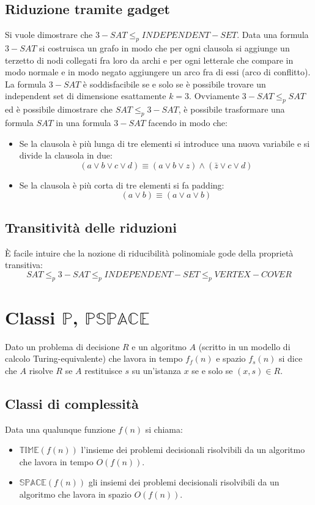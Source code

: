 \subsection{Riduzione tramite gadget}
Si vuole dimostrare che $3-SAT\le_p INDEPENDENT-SET$. Data una formula $3-SAT$ si costruisca un grafo in modo che per ogni clausola si aggiunge un terzetto di nodi collegati fra loro
da archi e per ogni letterale che compare in modo normale e in modo negato aggiungere un arco fra di essi (arco di conflitto). La formula $3-SAT$ \`e soddisfacibile se e solo se \`e
possibile trovare un independent set di dimensione esattamente $k=3$.
Ovviamente $3-SAT\le_p SAT$ ed \`e possibile dimostrare che $SAT\le_p 3-SAT$, \`e possibile trasformare una formula $SAT$ in una formula $3-SAT$ facendo in modo che:
\begin{itemize}
	\item Se la clausola \`e pi\`u lunga di tre elementi si introduce una nuova variabile e si divide la clausola in due:
		$$(a\lor b\lor c\lor d)\equiv (a\lor b\lor z)\land(\bar{z}\lor c\lor d)$$
	\item Se la clausola \`e pi\`u corta di tre elementi si fa padding:
		$$(a\lor b)\equiv (a\lor a\lor b)$$
\end{itemize}
\subsection{Transitivit\`a delle riduzioni}
\`E facile intuire che la nozione di riducibilit\`a polinomiale gode della propriet\`a transitiva:
$$SAT \le_p 3-SAT \le_p INDEPENDENT-SET \le_p VERTEX-COVER$$
\section{Classi $\mathbf{\mathbb{P}}$, $\mathbf{\mathbb{PSPACE}}$}
Dato un problema di decisione $R$ e un algoritmo $A$ (scritto in un modello di calcolo Turing-equivalente) che lavora in tempo $f_f(n)$ e spazio $f_s(n)$ si dice che $A$ risolve $R$ se
$A$ restituisce $s$ su un'istanza $x$ se e solo se $(x, s)\in R$. 
\subsection{Classi di complessit\`a}
Data una qualunque funzione $f(n)$ si chiama:
\begin{itemize}
	\item $\mathbb{TIME}(f(n))$ l'insieme dei problemi decisionali risolvibili da un algoritmo che lavora in tempo $O(f(n))$.
	\item $\mathbb{SPACE}(f(n))$ gli insiemi dei problemi decisionali risolvibili da un algoritmo che lavora in spazio $O(f(n))$.
\end{itemize}
